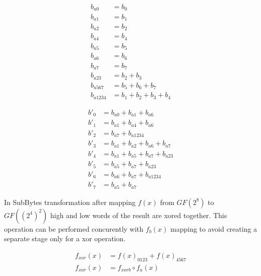 \begin{equation}
\label{eq:mul_delta_a}
\begin{aligned}
b_{a0}    &= b_0                    \\
b_{a1}    &= b_1                    \\
b_{a2}    &= b_2                    \\
b_{a4}    &= b_4                    \\
b_{a5}    &= b_5                    \\
b_{a6}    &= b_6                    \\
b_{a7}    &= b_7                    \\
b_{a23}   &= b_2 + b_3              \\
b_{a567}  &= b_5 + b_6 + b_7        \\
b_{a1234} &= b_1 + b_2 + b_3 + b_4
\end{aligned}
\end{equation}

\begin{equation}
\label{eq:mul_delta_b}
\begin{aligned}
b'_0 &= b_{a0} + b_{a1} + b_{a6}           \\
b'_1 &= b_{a1} + b_{a4} + b_{a6}           \\
b'_2 &= b_{a7} + b_{a1234}                 \\
b'_3 &= b_{a1} + b_{a2} + b_{a6} + b_{a7}  \\
b'_4 &= b_{a1} + b_{a5} + b_{a7} + b_{a23} \\
b'_5 &= b_{a5} + b_{a7} + b_{a23}          \\
b'_6 &= b_{a6} + b_{a7} + b_{a1234}        \\
b'_7 &= b_{a5} + b_{a7}                    
\end{aligned}
\end{equation}

In SubBytes transformation after mapping $f(x)$ from $GF(2^8)$ to $GF((2^4)^2)$ high and low words of the result are xored together. This operation can be performed concurently with $f_b(x)$ mapping to avoid creating a separate stage only for a xor operation.

\begin{equation}
\begin{aligned}
f_{xor}(x) &= f(x)_{0123} + f(x)_{4567} \\
f_{xor}(x) &= f_{xorb} \circ f_a(x)
\end{aligned}
\end{equation}

